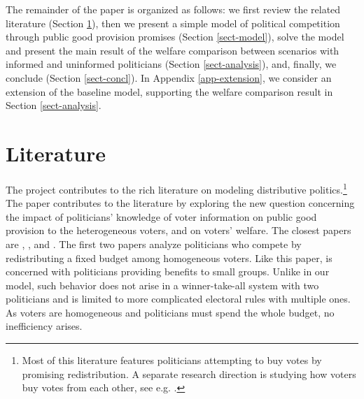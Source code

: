 \documentclass[12pt,english]{article}
\begin{document}
The remainder of the paper is organized as follows: we first review the related literature (Section \ref{sect-liter}), then we present a simple model of political competition through public good provision promises (Section \ref{sect-model}), solve the model and present the main result of the welfare comparison between scenarios with informed and uninformed politicians (Section \ref{sect-analysis}), and, finally, we conclude (Section \ref{sect-concl}). In Appendix \ref{app-extension}, we consider an extension of the baseline model, supporting the welfare comparison result in Section \ref{sect-analysis}.   









\section{Literature} \label{sect-liter}

 
The project contributes to the rich literature on modeling distributive politics.\footnote{Most of this literature features politicians attempting to buy votes by promising redistribution. A separate research direction is studying how voters buy votes from each other, see e.g. \cite{tsakas2021vote}.} The paper contributes to the literature by exploring the new question concerning the impact of politicians’ knowledge of voter information on public good provision to the heterogeneous voters, and on voters' welfare.
The closest papers are \cite{myerson1993incentives}, \cite{lizzeri2001provision}, and \cite{dixit1996determinants}. The first two papers analyze politicians who compete by redistributing a fixed budget among homogeneous voters. Like this paper, \cite{myerson1993incentives} is concerned with politicians providing benefits to small groups. Unlike in our model, such behavior does not arise in a winner-take-all system with two politicians and is limited to more complicated electoral rules with multiple ones. As voters are homogeneous and politicians must spend the whole budget, no inefficiency arises. 
\end{document}
